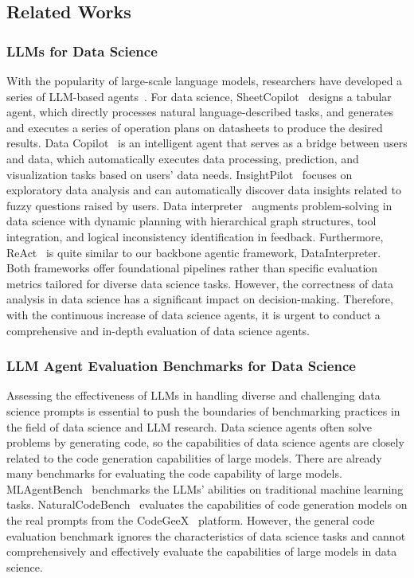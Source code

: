\subsection{Related Works}
\label{sec: related_works}
\subsubsection{LLMs for Data Science} 
With the popularity of large-scale language models, researchers have developed a series of LLM-based agents~\cite{yao2022react, wang2024battleagentbench, xu2024androidlab, xia2024scenegenagent}. 
For data science, SheetCopilot~\citep{li2024sheetcopilot} designs a tabular agent, which directly processes natural language-described tasks, and generates and executes a series of operation plans on datasheets to produce the desired results. 
Data Copilot~\citep{zhang2024data} is an intelligent agent that serves as a bridge between users and data, which automatically executes data processing, prediction, and visualization tasks based on users' data needs.
InsightPilot~\citep{ma2023insightpilot} focuses on exploratory data analysis and can automatically discover data insights related to fuzzy questions raised by users.
Data interpreter~\citep{hong2024datainterpreter} augments problem-solving in data science with dynamic planning with hierarchical graph structures, tool integration, and logical inconsistency identification in feedback.
Furthermore, ReAct~\cite{yao2022react} is quite similar to our backbone agentic framework, DataInterpreter. Both frameworks offer foundational pipelines rather than specific evaluation metrics tailored for diverse data science tasks.
However, the correctness of data analysis in data science has a significant impact on decision-making.
Therefore, with the continuous increase of data science agents, it is urgent to conduct a comprehensive and in-depth evaluation of data science agents.


\subsubsection{LLM Agent Evaluation Benchmarks for Data Science}

Assessing the effectiveness of LLMs in handling diverse and challenging data science prompts is essential to push the boundaries of benchmarking practices in the field of data science and LLM research.
Data science agents often solve problems by generating code, so the capabilities of data science agents are closely related to the code generation capabilities of large models. 
There are already many benchmarks for evaluating the code capability of large models.
MLAgentBench~\citep{huang2023mlbenchmarking} benchmarks the LLMs' abilities on traditional machine learning tasks.
NaturalCodeBench~\citep{zhang2024naturalcodebench} evaluates the capabilities of code generation models on the real prompts from the CodeGeeX~\citep{zheng2023codegeex} platform.
However, the general code evaluation benchmark ignores the characteristics of data science tasks and cannot comprehensively and effectively evaluate the capabilities of large models in data science. 


